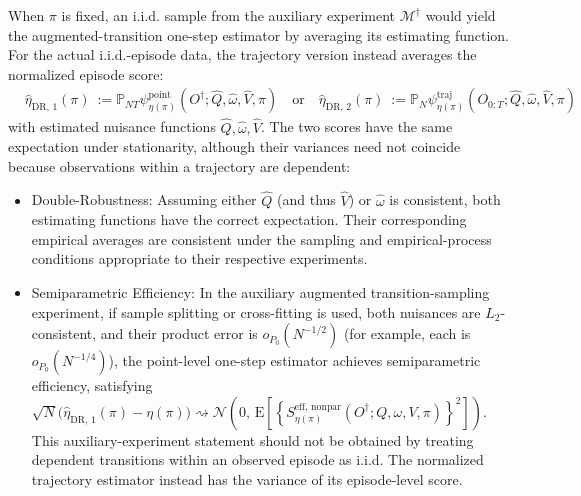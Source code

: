 \documentclass[12pt]{article}
\theoremstyle{remark}\newtheorem{remark}[theorem]{Remark}\theoremstyle{plain}
\newcommand{\E}{\mathrm{E}}
\newcommand{\EIF}{S^{\text{eff, nonpar}}}
\newcommand{\EstFunTraj}{{\psi}^{\text{traj}}}
\newcommand{\EstFunPoi}{{\psi}^{\text{point}}}
\newcommand{\pn}{\mathbb{P}_N}
\newcommand{\pnt}{\mathbb{P}_{NT}}
\begin{document}
When $\pi$ is fixed, an i.i.d. sample from the auxiliary experiment
$\mathcal M^\dagger$ would yield the augmented-transition one-step
estimator by averaging its estimating function.  For the actual
i.i.d.-episode data, the trajectory version instead averages the
normalized episode score:
\begin{equation*}
    \begin{aligned}
        & \widehat{\eta}_{\text{DR, 1}}(\pi) & := \pnt \EstFunPoi_{\eta(\pi)}(O^\dagger;\widehat{Q},  \widehat{\omega},  \widehat{V},  \pi) \quad
        \text{or} \quad \widehat{\eta}_{\text{DR, 2}}(\pi) & := \pn\EstFunTraj_{\eta(\pi)}(O_{0:T};\widehat{Q},  \widehat{\omega},  \widehat{V},  \pi)
    \end{aligned}
\end{equation*}
with estimated nuisance functions $\widehat{Q},\widehat{\omega},
\widehat{V}$.  The two scores have the same expectation under
stationarity, although their variances need not coincide because
observations within a trajectory are dependent:
\begin{itemize}
    \item Double-Robustness: Assuming either $\widehat{Q}$ (and thus $\widehat{V}$) or $\widehat{\omega}$ is consistent, both estimating functions have the correct expectation.  Their corresponding empirical averages are consistent under the sampling and empirical-process conditions appropriate to their respective experiments.

    \item Semiparametric Efficiency: In the auxiliary augmented
    transition-sampling experiment, if sample splitting or
    cross-fitting is used, both nuisances are $L_2$-consistent, and
    their product error is $o_{P_0}(N^{-1/2})$ (for example, each is
    $o_{P_0}(N^{-1/4})$), the point-level one-step estimator
    achieves semiparametric efficiency, satisfying
    $
        \sqrt{N} \big( \widehat{\eta}_{\text{DR, 1}}(\pi) - \eta(\pi) \big)
        \rightsquigarrow
        \mathcal{N}\!\left(
        0,\,
        \E\!\left[
        \left\{
        \EIF_{\eta(\pi)}
        (O^\dagger;Q,\omega,V,\pi)\right\}^2\right]\right).
    $
    This auxiliary-experiment statement should not be obtained by
    treating dependent transitions within an observed episode as
    i.i.d.  The normalized trajectory estimator instead has the
    variance of its episode-level score.
\end{itemize}
\end{document}
